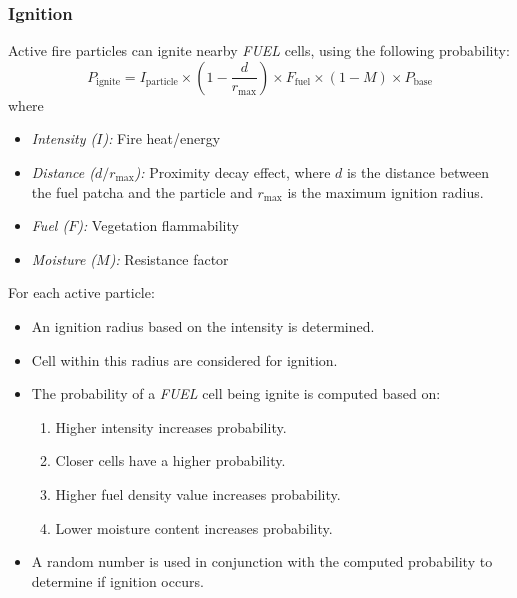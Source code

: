 \subsubsection{Ignition}
Active fire particles can ignite nearby \textit{FUEL} cells, using the following probability:
\begin{equation}
	P_{\text{ignite}} = I_{\text{particle}} \times (1 - \frac{d}{r_{\text{max}}}) \times F_{\text{fuel}} \times (1 - M) \times P_{\text{base}}
	\label{eq:fire_ign}
\end{equation}
where
\begin{itemize}
	\item \textit{Intensity ($I$):} Fire heat/energy
	\item \textit{Distance ($d/r_{\text{max}}$):} Proximity decay effect, where $d$ is the distance between the fuel patcha and the particle and $r_{\text{max}}$ is the maximum ignition radius.
	\item \textit{Fuel ($F$):} Vegetation flammability
	\item \textit{Moisture ($M$):} Resistance factor
\end{itemize}

For each active particle:
\begin{itemize}
	\item An ignition radius based on the intensity is determined.
	\item Cell within this radius are considered for ignition.
	\item The probability of a \textit{FUEL} cell being ignite is computed based on:
	      \begin{enumerate}
		      \item Higher intensity increases probability.
		      \item Closer cells have a higher probability.
		      \item Higher fuel density value increases probability.
		      \item Lower moisture content increases probability.
	      \end{enumerate}
	\item A random number is used in conjunction with the computed probability to determine if ignition occurs.
\end{itemize}
